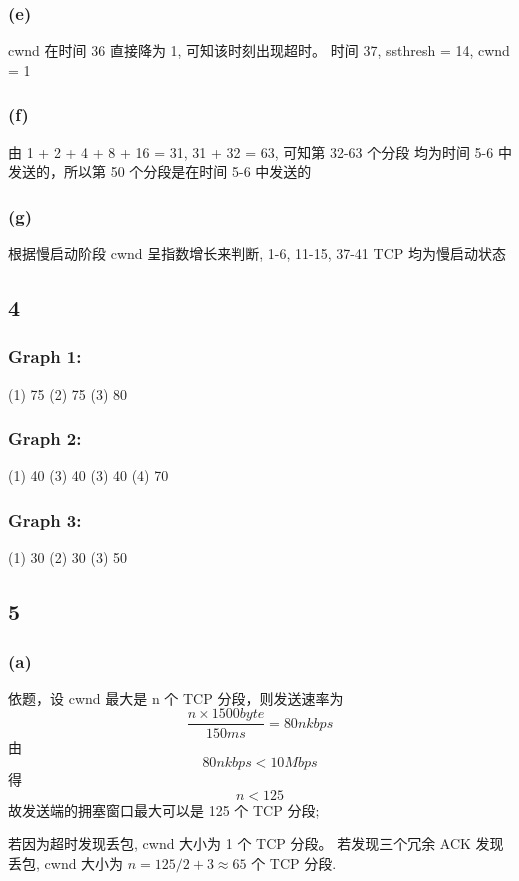 \documentclass[UTF8]{ctexart}
\begin{document}
\begin{sloppypar}
    \subsubsection*{(e)}
        cwnd 在时间 36 直接降为 1, 可知该时刻出现超时。
        时间 37, ssthresh = 14, cwnd = 1
    \subsubsection*{(f)}
        由 1 + 2 + 4 + 8 + 16 = 31, 31 + 32 = 63, 可知第 32-63 个分段
        均为时间 5-6 中发送的，所以第 50 个分段是在时间 5-6 中发送的
    \subsubsection*{(g)}
        根据慢启动阶段 cwnd 呈指数增长来判断, 1-6, 11-15, 37-41 TCP 均为慢启动状态

\subsection*{4}
    \subsubsection*{Graph 1:}
        (1) 75 (2) 75 (3) 80
    \subsubsection*{Graph 2:}
        (1) 40 (3) 40 (3) 40 (4) 70
    \subsubsection*{Graph 3:}
        (1) 30 (2) 30 (3) 50

\subsection*{5}
    \subsubsection*{(a)}
        依题，设 cwnd 最大是 n 个 TCP 分段，则发送速率为
        $$\frac{n \times 1500 byte}{150ms} = 80n kbps$$
        由$$80n kbps < 10 Mbps$$得$$n < 125$$
        故发送端的拥塞窗口最大可以是 125 个 TCP 分段;
        
        若因为超时发现丢包, cwnd 大小为 1 个 TCP 分段。
        若发现三个冗余 ACK 发现丢包, cwnd 大小为 $n = 125/2 + 3 \approx 65$
         个 TCP 分段.
        

\end{sloppypar}
\end{document}
